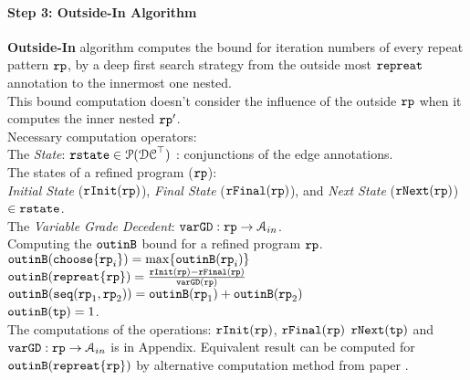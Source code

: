  \paragraph{Step 3: Outside-In Algorithm}
\label{sec:outinalg}
\textbf{Outside-In} algorithm computes the bound for iteration numbers of every repeat pattern $\mathtt{rp}$,
by a deep first search strategy from the outside most $\mathtt{repreat}$ annotation
to the innermost one nested.
\\
This bound computation doesn't consider the influence of the outside $\mathtt{rp}$
when it computes the inner nested $\mathtt{rp}'$.
\\
Necessary computation operators:
\\
The \emph{State}: 
$\mathtt{rstate} \in \mathcal{P}(\mathcal{DC}^{\top})$ : conjunctions of the edge annotations.
\\
The states of a refined program ($\mathtt{rp}$):
\\
\emph{Initial State} ($\mathtt{rInit}(\mathtt{rp})$), 
\emph{Final State} ($\mathtt{rFinal}(\mathtt{rp})$), and \emph{Next State} ($\mathtt{rNext}(\mathtt{rp})$)  $\in \mathtt{rstate}$.
\\
The \emph{Variable Grade Decedent}: $\mathtt{varGD} : \mathtt{rp} \to \mathcal{A}_{in}$.
\\
Computing the $\mathtt{outinB}$ bound for a refined program $\mathtt{rp}$. 
\\
$\mathtt{outinB}(\mathtt{choose}\{\mathtt{rp}_i\}) =  \max\{\mathtt{outinB}(\mathtt{rp}_i)\}$
\\
$\mathtt{outinB}(\mathtt{repreat}\{\mathtt{rp}\}) =  \frac{\mathtt{rInit}(\mathtt{rp}) - \mathtt{rFinal}(\mathtt{rp})}{\mathtt{varGD}(\mathtt{rp})}$
\\
$\mathtt{outinB}(\mathtt{seq}(\mathtt{rp}_1, \mathtt{rp}_2)) =  \mathtt{outinB}(\mathtt{rp}_1)+ \mathtt{outinB}( \mathtt{rp}_2)$
\\
$\mathtt{outinB}(\mathtt{tp}) =  1$.
\\
The computations of the operations: $\mathtt{rInit}(\mathtt{rp})$,
$\mathtt{rFinal}(\mathtt{rp})$ $\mathtt{rNext}(\mathtt{tp})$ and $\mathtt{varGD} : \mathtt{rp} \to \mathcal{A}_{in}$ is in Appendix.
Equivalent result can be computed for $\mathtt{outinB}(\mathtt{repreat}\{\mathtt{rp}\})$ by alternative computation method from paper \cite{GulwaniJK09}.
